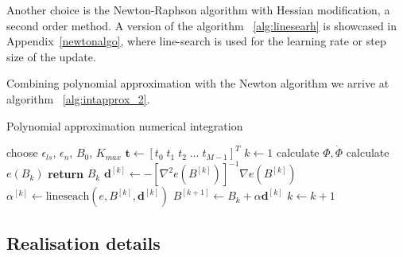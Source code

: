 \documentclass[11pt]{report}
\begin{document}
    Another choice is the Newton-Raphson algorithm with Hessian modification, a second order method.
    A version of the algorithm ~\ref{alg:linesearh} is showcased in Appendix~\ref{newtonalgo}, where line-search is used for the learning
    rate or step size of the update.

    Combining polynomial approximation with the Newton algorithm we arrive at algorithm ~\ref{alg:intapprox_2}.

    \begin{algorithm}
        \caption{Polynomial approximation numerical integration}
        \begin{algorithmic}
            \State choose $\epsilon_{ls}$, $\epsilon_{n}$, $B_0$, $K_{max}$
            \State $\pmb{t} \gets [t_0 \; t_1 \; t_2 \; \dots \; t_{M-1} ]^T$
            \State $k \gets 1$
            \State calculate $\Phi, \dot\Phi$
            \Repeat
                \State calculate $e(B_k)$
                    \State \textbf{return} $B_k$
                \EndIf
                \State $ \pmb{d}^{[k]} \gets -\left[ \nabla^2 e(B^{[k]}) \right]^{-1} \nabla e(B^{[k]})$
                \State $ \alpha^{[k]} \gets \text{lineseach}(e, B^{[k]}, \pmb{d}^{[k]}) $
                \State $ B^{[k+1]} \gets B_k + \alpha \pmb{d}^{[k]}$
                \State $k \gets k+1$
        \end{algorithmic}
        \label{alg:intapprox_2}
    \end{algorithm}

    \subsection{Realisation details}
\end{document}
